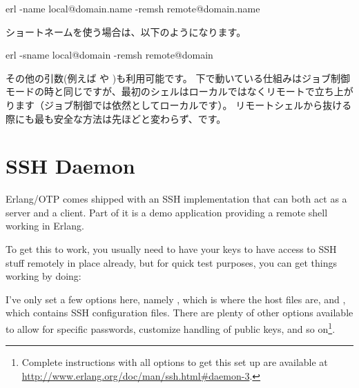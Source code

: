 \begin{VerbatimText}
erl -name local@domain.name -remsh remote@domain.name
\end{VerbatimText}

ショートネームを使う場合は、以下のようになります。

\begin{VerbatimText}
erl -sname local@domain -remsh remote@domain
\end{VerbatimText}

その他の引数(例えば  や )も利用可能です。
下で動いている仕組みはジョブ制御モードの時と同じですが、最初のシェルはローカルではなくリモートで立ち上がります（ジョブ制御では依然としてローカルです）。
リモートシェルから抜ける際にも最も安全な方法は先ほどと変わらず、です。

\section{SSH Daemon}

Erlang/OTP comes shipped with an SSH implementation that can both act as a server and a client. Part of it is a demo application providing a remote shell working in Erlang.

To get this to work, you usually need to have your keys to have access to SSH stuff remotely in place already, but for quick test purposes, you can get things working by doing:


I've only set a few options here, namely , which is where the host files are, and , which contains SSH configuration files. There are plenty of other options available to allow for specific passwords, customize handling of public keys, and so on\footnote{Complete instructions with all options to get this set up are available at \href{http://www.erlang.org/doc/man/ssh.html\#daemon-3}{http://www.erlang.org/doc/man/ssh.html\#daemon-3}.}.

